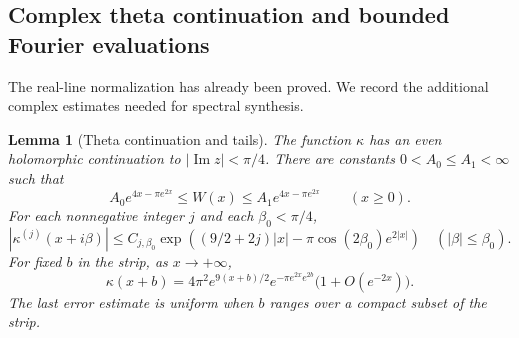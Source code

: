 \documentclass[11pt,a4paper]{article}
\numberwithin{equation}{section}
\newtheorem{lemma}[theorem]{Lemma}
\theoremstyle{definition}\newtheorem{definition}[theorem]{Definition}
\theoremstyle{remark}\newtheorem{remark}[theorem]{Remark}
\begin{document}
\subsection{Complex theta continuation and bounded Fourier evaluations}\label{d:sec:theta}
The real-line normalization has already been proved. We record the additional complex estimates needed for spectral synthesis.


\begin{lemma}[Theta continuation and tails]\label{d:lem:theta-tails}
The function $\kappa$ has an even holomorphic continuation to $|\operatorname{Im}z|<\pi/4$.
There are constants $0<A_0\le A_1<\infty$ such that
\begin{equation}\label{d:eq:W-two-sided}
 A_0 e^{4x-\pi e^{2x}}\le W(x)\le A_1 e^{4x-\pi e^{2x}}
 \qquad(x\ge0).
\end{equation}
For each nonnegative integer $j$ and each $\beta_0<\pi/4$,
\begin{equation}\label{d:eq:strip-upper}
 |\kappa^{(j)}(x+i\beta)|\le C_{j,\beta_0}
 \exp\!\left((9/2+2j)|x|-\pi\cos(2\beta_0)e^{2|x|}\right)
 \quad(|\beta|\le\beta_0).
\end{equation}
For fixed $b$ in the strip, as $x\to+\infty$,
\begin{equation}\label{d:eq:complex-asymptotic}
 \kappa(x+b)=4\pi^2e^{9(x+b)/2}e^{-\pi e^{2x}e^{2b}}
 \bigl(1+O(e^{-2x})\bigr).
\end{equation}
The last error estimate is uniform when $b$ ranges over a compact subset of the strip.
\end{lemma}
\end{document}

